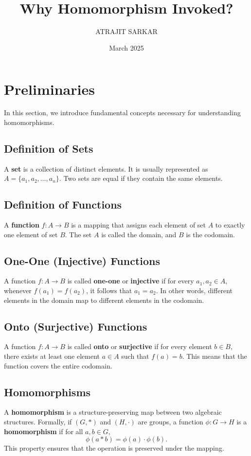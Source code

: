 \documentclass{article}
\title{Why Homomorphism Invoked?}
\author{ATRAJIT SARKAR}
\date{March 2025}
\begin{document}
\maketitle

\tableofcontents

\section{Preliminaries}
In this section, we introduce fundamental concepts necessary for understanding homomorphisms.

\subsection{Definition of Sets}
\cite{herstein1975topics}
A \textbf{set} is a collection of distinct elements. It is usually represented as \( A = \{a_1, a_2, \dots, a_n\} \). Two sets are equal if they contain the same elements.

\subsection{Definition of Functions}
A \textbf{function} \( f: A \to B \) is a mapping that assigns each element of set \( A \) to exactly one element of set \( B \). The set \( A \) is called the domain, and \( B \) is the codomain.

\subsection{One-One (Injective) Functions}
A function \( f: A \to B \) is called \textbf{one-one} or \textbf{injective} if for every \( a_1, a_2 \in A \), whenever \( f(a_1) = f(a_2) \), it follows that \( a_1 = a_2 \). In other words, different elements in the domain map to different elements in the codomain.

\subsection{Onto (Surjective) Functions}
A function \( f: A \to B \) is called \textbf{onto} or \textbf{surjective} if for every element \( b \in B \), there exists at least one element \( a \in A \) such that \( f(a) = b \). This means that the function covers the entire codomain.

\subsection{Homomorphisms}
\cite{dummit2004abstract}
A \textbf{homomorphism} is a structure-preserving map between two algebraic structures. Formally, if \( (G, *) \) and \( (H, \cdot) \) are groups, a function \( \phi: G \to H \) is a \textbf{homomorphism} if for all \( a, b \in G \),
\[
\phi(a * b) = \phi(a) \cdot \phi(b).
\]
This property ensures that the operation is preserved under the mapping.
\end{document}
